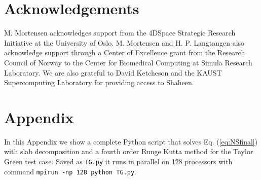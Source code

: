 \documentclass[final,3p,times,twocolumn]{elsarticle}
\newcommand{\inpyth}{\lstinline[style=inlinestyle]}
\begin{document}
\section*{Acknowledgements}
M. Mortensen acknowledges support from the 4DSpace Strategic Research 
Initiative at the University of Oslo. M. Mortensen and H. P. Langtangen also 
acknowledge support through a Center of Excellence grant from the Research 
Council of Norway to the Center for Biomedical Computing at Simula Research 
Laboratory. We are also grateful to David Ketcheson and the 
KAUST Supercomputing Laboratory for providing access to Shaheen.



\section*{Appendix}
\label{sec:appendix}
In this Appendix we show a complete Python script that solves Eq. 
(\ref{eq:NSfinal}) with slab decomposition and a fourth order Runge Kutta 
method for the Taylor Green test case. Saved as \inpyth{TG.py} it runs in 
parallel on 128 processors with command \inpyth{mpirun -np 128 python TG.py}.
\end{document}
